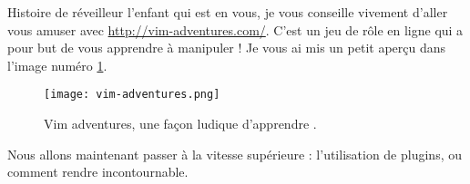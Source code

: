 \bigskip
Histoire de réveilleur l'enfant qui est en vous, je vous conseille vivement d'aller vous amuser avec \url{http://vim-adventures.com/}. C'est un jeu de rôle en ligne qui a pour but de vous apprendre à manipuler \vim ! Je vous ai mis un petit aperçu dans l'image numéro \ref{fig:vim-adventures}.

\begin{figure}%
  \texttt{[image: vim-adventures.png]}
  \caption{Vim adventures, une façon ludique d'apprendre \vim.}
  \label{fig:vim-adventures}
\end{figure}


Nous allons maintenant passer à la vitesse supérieure : l'utilisation de plugins, ou comment rendre \vim incontournable.
